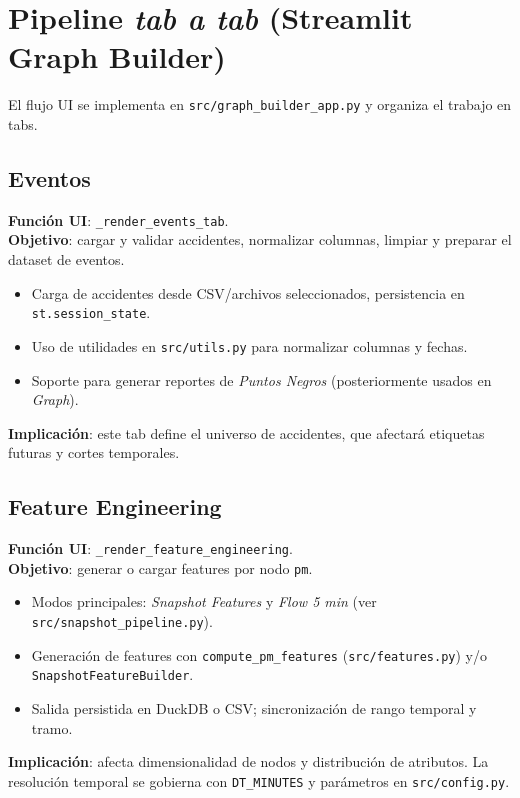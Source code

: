\section{Pipeline \emph{tab a tab} (Streamlit Graph Builder)}
El flujo UI se implementa en \texttt{src/graph\_builder\_app.py} y organiza el trabajo en tabs.

\subsection{Eventos}
\textbf{Funci\'on UI}: \texttt{\_render\_events\_tab}.\\
\textbf{Objetivo}: cargar y validar accidentes, normalizar columnas, limpiar y preparar el dataset de eventos.
\begin{itemize}[leftmargin=*]
  \item Carga de accidentes desde CSV/archivos seleccionados, persistencia en \texttt{st.session\_state}.
  \item Uso de utilidades en \texttt{src/utils.py} para normalizar columnas y fechas.
  \item Soporte para generar reportes de \emph{Puntos Negros} (posteriormente usados en \emph{Graph}).
\end{itemize}
\textbf{Implicaci\'on}: este tab define el universo de accidentes, que afectar\'a etiquetas futuras y cortes temporales.

\subsection{Feature Engineering}
\textbf{Funci\'on UI}: \texttt{\_render\_feature\_engineering}.\\
\textbf{Objetivo}: generar o cargar features por nodo \texttt{pm}.
\begin{itemize}[leftmargin=*]
  \item Modos principales: \emph{Snapshot Features} y \emph{Flow 5 min} (ver \texttt{src/snapshot\_pipeline.py}).
  \item Generaci\'on de features con \texttt{compute\_pm\_features} (\texttt{src/features.py}) y/o \texttt{SnapshotFeatureBuilder}.
  \item Salida persistida en DuckDB o CSV; sincronizaci\'on de rango temporal y tramo.
\end{itemize}
\textbf{Implicaci\'on}: afecta dimensionalidad de nodos y distribuci\'on de atributos. La resoluci\'on temporal se gobierna con \texttt{DT\_MINUTES} y par\'ametros en \texttt{src/config.py}.

